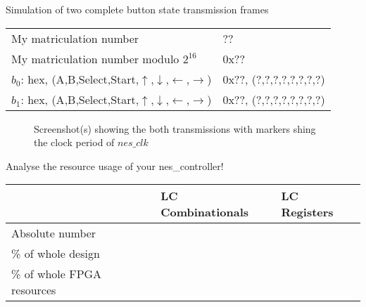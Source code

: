 \documentclass[10pt,a4paper,titlepage,oneside]{article}
\begin{document}
\begin{qa}{Simulation of two complete button state transmission frames}

\begin{center}
\begin{tabular}{ll}
\hline\hline
My matriculation number                   &  ?? \\
My matriculation number modulo $2^{16}$   & 0x?? \\
$b_0$: hex, ({A},{B},{Select},{Start},{$\uparrow$},{$\downarrow$},{$\leftarrow$},{$\rightarrow$})  & 0x??, (?,?,?,?,?,?,?,?) \\
$b_1$: hex, ({A},{B},{Select},{Start},{$\uparrow$},{$\downarrow$},{$\leftarrow$},{$\rightarrow$})  & 0x??, (?,?,?,?,?,?,?,?) \\\hline
\end{tabular}
\end{center}

\begin{figure}[h!]
	\centering
	\dummyimage
	\caption{Screenshot(s) showing the both transmissions with markers shing the clock period of $nes\_clk$}
\end{figure}

\end{qa}


\begin{qa}{Analyse the resource usage of your \textsf{nes\_controller}!}
\centering
\begin{tabular}{l|ll}
	\hline
		                   & LC Combinationals & LC Registers        \\ \hline\hline 
	Absolute number            &                   &                     \\
	\% of whole design         &                   &                     \\ 
	\% of whole FPGA resources &                   &                     \\ \hline
\end{tabular}
\end{qa}


\end{document}
